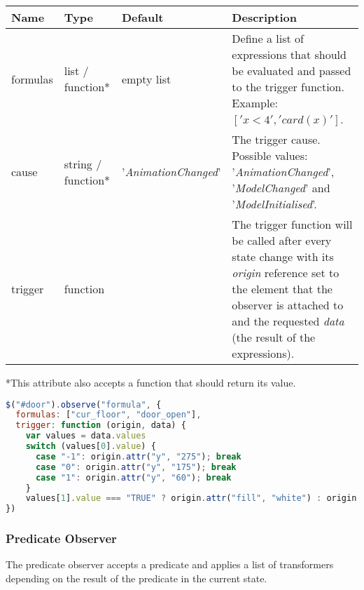 \begin{tabular}{ l l l p{7cm} }
  \textbf{Name} & \textbf{Type} & \textbf{Default} & \textbf{Description} \\
  \hline\noalign{\medskip}
  formulas & list / function* & empty list & Define a list of expressions that should be evaluated and passed to the trigger function. Example: $['x < 4', 'card(x)']$.\\
  \hline\noalign{\medskip}
  cause & string / function* & '\textit{AnimationChanged}' & The trigger cause. Possible values: '\textit{AnimationChanged}', '\textit{ModelChanged}' and '\textit{ModelInitialised}'. \\
  \hline\noalign{\medskip}
  trigger & function &  & The trigger function will be called after every state change with its \textit{origin} reference set to the element that the observer is attached to and the requested \textit{data} (the result of the expressions). \\
\end{tabular}

*This attribute also accepts a function that should return its value.

\begin{lstlisting}[float=ht,language=JavaScript]
$("#door").observe("formula", {
  formulas: ["cur_floor", "door_open"],
  trigger: function (origin, data) {
    var values = data.values
    switch (values[0].value) {
      case "-1": origin.attr("y", "275"); break
      case "0": origin.attr("y", "175"); break
      case "1": origin.attr("y", "60"); break
    }
    values[1].value === "TRUE" ? origin.attr("fill", "white") : origin.attr("fill", "lightgray")
})
\end{lstlisting}

\subsubsection{Predicate Observer}

The predicate observer accepts a predicate and applies a list of transformers depending on the result of the predicate in the current state.

